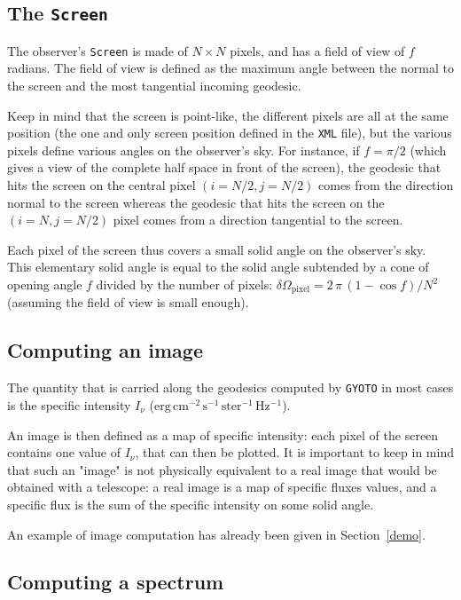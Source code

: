 \documentclass[a4paper,12pt]{article}
\begin{document}
\subsection{The \texttt{Screen}}

The observer's \texttt{Screen} is made of $N\times N$ pixels, and has a field of view of $f$ radians. The field of view is defined as the maximum angle between the normal to the screen and the most tangential incoming geodesic. 

Keep in mind that the screen is point-like, the different pixels are all at the same position (the one and only screen position defined in the \texttt{XML} file), but the various pixels define various angles on the observer's sky.  For instance, if $f=\pi / 2$ (which gives a view of the complete half space in front of the screen), the geodesic that hits the screen on the central pixel $(i=N/2,j=N/2)$ comes from the direction normal to the screen whereas the geodesic that hits the screen on the $(i=N,j=N/2)$ pixel comes from a direction tangential to the screen.

Each pixel of the screen thus covers a small solid angle on the observer's sky. This elementary solid angle is equal to the solid angle subtended by a cone of opening angle $f$ divided by the number of pixels: $\delta\Omega_{\mathrm{pixel}} = 2\,\pi\,(1-\cos f) / N^{2}$ (assuming the field of view is small enough).

\subsection{Computing an image}

The quantity that is carried along the geodesics computed by \texttt{GYOTO} in most cases is the specific intensity $I_{\nu}$ ($\mathrm{erg\,cm^{-2}\,s^{-1}\,ster^{-1}\,Hz^{-1}}$).

An image is then defined as a map of specific intensity: each pixel of the screen contains one value of $I_{\nu}$, that can then be plotted. It is important to keep in mind that such an "image" is not physically equivalent to a real image that would be obtained with a telescope: a real image is a map of specific fluxes values, and a specific flux is the sum of the specific intensity on some solid angle.

An example of image computation has already been given in Section~\ref{demo}.


\subsection{Computing a spectrum}
\end{document}
